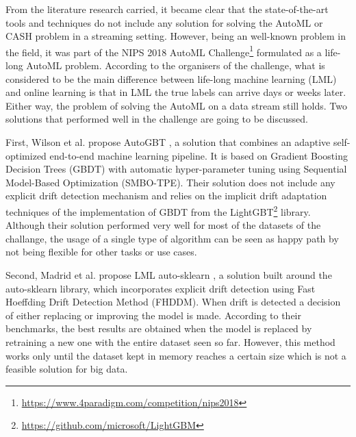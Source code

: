 \documentclass{sig-alternate-br}
\begin{document}
From the literature research carried, it became clear that the state-of-the-art tools and techniques do not include any solution for solving the AutoML or CASH problem in a streaming setting. However, being an well-known problem in the field, it was part of the NIPS 2018 AutoML Challenge\footnote{\url{https://www.4paradigm.com/competition/nips2018}} formulated as a life-long AutoML problem. According to the organisers of the challenge, what is considered to be the main difference between life-long machine learning (LML) and online learning is that in LML the true labels can arrive days or weeks later. Either way, the problem of solving the AutoML on a data stream still holds. Two solutions that performed well in the challenge are going to be discussed. 

First, Wilson et al. propose AutoGBT \cite{wilson2020automatically}, a solution that combines an adaptive self-optimized end-to-end machine learning pipeline. It is based on Gradient Boosting Decision Trees (GBDT) with automatic hyper-parameter tuning using Sequential Model-Based Optimization (SMBO-TPE). Their solution does not include any explicit drift detection mechanism and relies on the implicit drift adaptation techniques of the implementation of GBDT from the LightGBT\footnote{\url{https://github.com/microsoft/LightGBM}} library. Although their solution performed very well for most of the datasets of the challange, the usage of a single type of algorithm can be seen as happy path by not being flexible for other tasks or use cases.

Second, Madrid et al. propose LML auto-sklearn \cite{madrid2019towards}, a solution built around the auto-sklearn library, which incorporates explicit drift detection using Fast Hoeffding Drift Detection Method (FHDDM). When drift is detected a decision of either replacing or improving the model is made. According to their benchmarks, the best results are obtained when the model is replaced by retraining a new one with the entire dataset seen so far. However, this method works only until the dataset kept in memory reaches a certain size which is not a feasible solution for big data.
\end{document}
